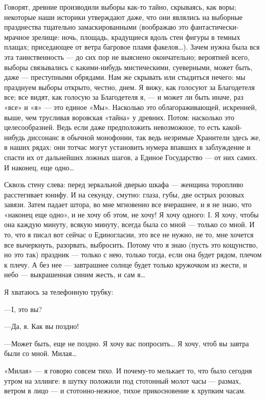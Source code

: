 \documentclass[11pt,openany]{book}
\begin{document}
Говорят, древние производили выборы как-то тайно, скрываясь, как воры; некоторые наши историки утверждают даже, что они являлись на выборные празднества тщательно замаскированными (воображаю это фантастически-мрачное зрелище: ночь, площадь, крадущиеся вдоль стен фигуры в темных плащах; приседающее от ветра багровое пламя факелов\ldots{}). Зачем нужна была вся эта таинственность --- до сих пор не выяснено окончательно; вероятней всего, выборы связывались с какими-нибудь мистическими, суеверными, может быть, даже --- преступными обрядами. Нам же скрывать или стыдиться нечего: мы празднуем выборы открыто, честно, днем. Я вижу, как голосуют за Благодетеля все; все видят, как голосую за Благодетеля я, --- и может ли быть иначе, раз «все» и «я» --- это единое «Мы». Насколько это облагораживающей, искренней, выше, чем трусливая воровская «тайна» у древних. Потом: насколько это целесообразней. Ведь если даже предположить невозможное, то есть какой-нибудь диссонанс в обычной монофонии, так ведь незримые Хранители здесь же, в наших рядах: они тотчас могут установить нумера впавших в заблуждение и спасти их от дальнейших ложных шагов, а Единое Государство --- от них самих. И наконец, еще одно\ldots{}

Сквозь стену слева: перед зеркальной дверью шкафа --- женщина торопливо расстегивает юнифу. И на секунду, смутно: глаза, губы, две острых розовых завязи. Затем падает штора, во мне мгновенно все вчерашнее, и я не знаю, что «наконец еще одно», и не хочу об этом, не хочу! Я хочу одного: I. Я хочу, чтобы она каждую минуту, всякую минуту, всегда была со мной --- только со мной. И то, что я писал вот сейчас о Единогласии, это все не нужно, не то, мне хочется все вычеркнуть, разорвать, выбросить. Потому что я знаю (пусть это кощунство, но это так) праздник --- только с нею, только тогда, если она будет рядом, плечом к плечу. А без нее --- завтрашнее солнце будет только кружочком из жести, и небо --- выкрашенная синим жесть, и сам я\ldots{}

Я хватаюсь за телефонную трубку:

---I, это вы?

---Да, я. Как вы поздно!

---Может быть, еще не поздно. Я хочу вас попросить\ldots{} Я хочу, чтоб вы завтра были со мной. Милая\ldots{}

«Милая» --- я говорю совсем тихо. И почему-то мелькает то, что было сегодня утром на эллинге: в шутку положили под стотонный молот часы --- размах, ветром в лицо --- и стотонно-нежное, тихое прикосновение к хрупким часам.
\end{document}
